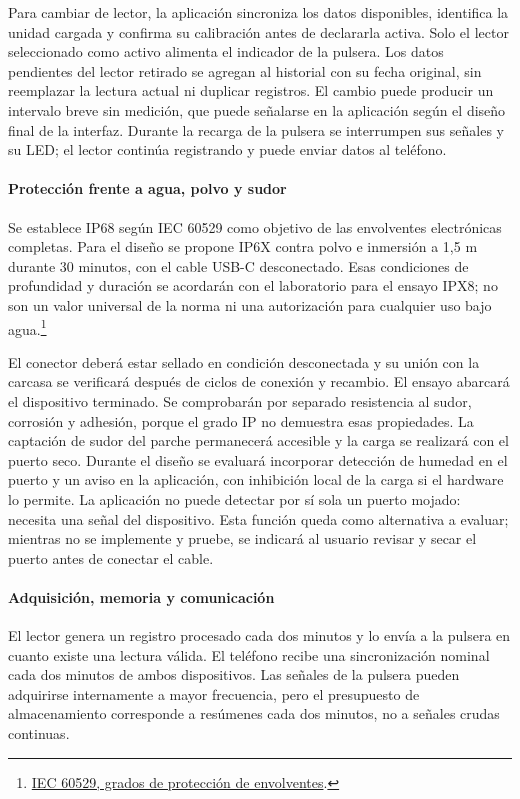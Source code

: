 Para cambiar de lector, la aplicación sincroniza los datos disponibles, identifica la unidad cargada y confirma su calibración antes de declararla activa. Solo el lector seleccionado como activo alimenta el indicador de la pulsera. Los datos pendientes del lector retirado se agregan al historial con su fecha original, sin reemplazar la lectura actual ni duplicar registros. El cambio puede producir un intervalo breve sin medición, que puede señalarse en la aplicación según el diseño final de la interfaz. Durante la recarga de la pulsera se interrumpen sus señales y su LED; el lector continúa registrando y puede enviar datos al teléfono.

\paragraph{Protección frente a agua, polvo y sudor}
Se establece IP68 según IEC 60529 como objetivo de las envolventes electrónicas completas. Para el diseño se propone IP6X contra polvo e inmersión a 1,5 m durante 30 minutos, con el cable USB-C desconectado. Esas condiciones de profundidad y duración se acordarán con el laboratorio para el ensayo IPX8; no son un valor universal de la norma ni una autorización para cualquier uso bajo agua.\footnote{\href{https://webstore.iec.ch/en/publication/2452}{IEC 60529, grados de protección de envolventes}.}

El conector deberá estar sellado en condición desconectada y su unión con la carcasa se verificará después de ciclos de conexión y recambio. El ensayo abarcará el dispositivo terminado. Se comprobarán por separado resistencia al sudor, corrosión y adhesión, porque el grado IP no demuestra esas propiedades. La captación de sudor del parche permanecerá accesible y la carga se realizará con el puerto seco. Durante el diseño se evaluará incorporar detección de humedad en el puerto y un aviso en la aplicación, con inhibición local de la carga si el hardware lo permite. La aplicación no puede detectar por sí sola un puerto mojado: necesita una señal del dispositivo. Esta función queda como alternativa a evaluar; mientras no se implemente y pruebe, se indicará al usuario revisar y secar el puerto antes de conectar el cable.

\paragraph{Adquisición, memoria y comunicación}
El lector genera un registro procesado cada dos minutos y lo envía a la pulsera en cuanto existe una lectura válida. El teléfono recibe una sincronización nominal cada dos minutos de ambos dispositivos. Las señales de la pulsera pueden adquirirse internamente a mayor frecuencia, pero el presupuesto de almacenamiento corresponde a resúmenes cada dos minutos, no a señales crudas continuas.

